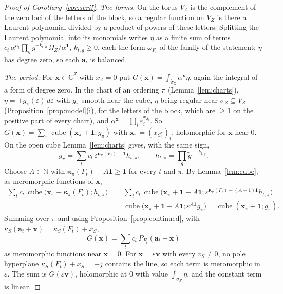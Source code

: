 \documentclass[11pt]{article}
\theoremstyle{plain}
\theoremstyle{definition}
\theoremstyle{remark}
\newcommand{\N}{\mathbb N}
\newcommand{\tsig}{\widetilde\sigma}
\begin{document}
\begin{proof}[Proof of Corollary~\ref{cor:serif}]
\emph{The forms.} On the torus $V_Z$ is the complement of the zero loci of the letters of the block, so a regular function on $V_Z$ is there a Laurent polynomial divided by a product of powers of these letters. Splitting the Laurent polynomial into its monomials writes $\eta$ as a finite sum of terms $c_t\,\alpha^{\mathbf a_t}\prod_gg^{-k_{t,g}}\,\Omega_Z/\alpha^{\mathbf 1}$, $k_{t,g}\ge0$, each the form $\omega_{F_t}$ of the family of the statement; $\eta$ has degree zero, so each $\mathbf a_t$ is balanced.

\emph{The period.} For $\mathbf x\in\mathbb C^Z$ with $x_Z=0$ put $G(\mathbf x)=\int_{\tsig_Z}\alpha^{\mathbf x}\eta$, again the integral of a form of degree zero. In the chart of an ordering $\pi$ (Lemma~\ref{lem:charts}), $\eta=\pm g_\pi(\varepsilon)\,d\varepsilon$ with $g_\pi$ smooth near the cube, $\eta$ being regular near $\tsig_Z\subseteq V_Z$ (Proposition~\ref{prop:model}(i), for the letters of the block, which are $\ge1$ on the positive part of every chart), and $\alpha^{\mathbf x}=\prod_i\varepsilon_i^{x_{S_i}}$. So $G(\mathbf x)=\sum_\pi \operatorname{cube}(\mathbf x_\pi+\mathbf 1;g_\pi)$ with $\mathbf x_\pi=(x_{S^\pi_i})_i$, holomorphic for $\mathbf x$ near $0$. On the open cube Lemma~\ref{lem:charts} gives, with the same sign,
\[
g_\pi=\sum_tc_t\,\varepsilon^{\boldsymbol\kappa_\pi(F_t)-\mathbf 1}h_{t,\pi},\qquad h_{t,\pi}=\prod_g\widetilde g^{\,-k_{t,g}} .
\]
Choose $A\in\N$ with $\boldsymbol\kappa_\pi(F_t)+A\mathbf 1\ge\mathbf 1$ for every $t$ and $\pi$. By Lemma~\ref{lem:cube}, as meromorphic functions of $\mathbf x$,
\begin{align*}
\sum_tc_t\,\operatorname{cube}\big(\mathbf x_\pi+\boldsymbol\kappa_\pi(F_t);h_{t,\pi}\big)&=\sum_tc_t\,\operatorname{cube}\big(\mathbf x_\pi+\mathbf 1-A\mathbf 1;\varepsilon^{\boldsymbol\kappa_\pi(F_t)+(A-1)\mathbf 1}h_{t,\pi}\big)\\
&=\operatorname{cube}\big(\mathbf x_\pi+\mathbf 1-A\mathbf 1;\varepsilon^{A\mathbf 1}g_\pi\big)=\operatorname{cube}(\mathbf x_\pi+\mathbf 1;g_\pi).
\end{align*}
Summing over $\pi$ and using Proposition~\ref{prop:continued}, with $\kappa_S(\mathbf a_t+\mathbf x)=\kappa_S(F_t)+x_S$,
\[
G(\mathbf x)=\sum_tc_t\,P_{F_t}(\mathbf a_t+\mathbf x)
\]
as meromorphic functions near $\mathbf x=0$. For $\mathbf x=\varepsilon\mathbf v$ with every $v_S\neq0$, no pole hyperplane $\kappa_S(F_t)+x_S=-j$ contains the line, so each term is meromorphic in $\varepsilon$. The sum is $G(\varepsilon\mathbf v)$, holomorphic at $0$ with value $\int_{\tsig_Z}\eta$, and the constant term is linear.
\end{proof}
\end{document}
